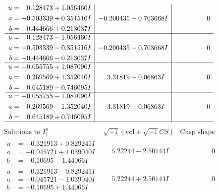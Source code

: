 \documentclass[1p]{elsarticle_modified}
\theoremstyle{definition}
\newcommand{\I}{\sqrt{-1}}
\begin{document}
$$\begin{array}{c|c|c}
\begin{aligned}
u &= \phantom{-}0.128473 + 1.056460 I \\
a &= -0.503339 + 0.351516 I \\
b &= -0.444666 + 0.213037 I\end{aligned}
 & -0.200435 + 0.703668 I & \phantom{-0.000000 } 0 \\ \hline\begin{aligned}
u &= \phantom{-}0.128473 - 1.056460 I \\
a &= -0.503339 - 0.351516 I \\
b &= -0.444666 - 0.213037 I\end{aligned}
 & -0.200435 - 0.703668 I & \phantom{-0.000000 } 0 \\ \hline\begin{aligned}
u &= -0.055755 + 1.087090 I \\
a &= \phantom{-}0.269569 + 1.352040 I \\
b &= \phantom{-}0.645189 - 0.746095 I\end{aligned}
 & \phantom{-}3.31819 + 0.06863 I & \phantom{-0.000000 } 0 \\ \hline\begin{aligned}
u &= -0.055755 - 1.087090 I \\
a &= \phantom{-}0.269569 - 1.352040 I \\
b &= \phantom{-}0.645189 + 0.746095 I\end{aligned}
 & \phantom{-}3.31819 - 0.06863 I & \phantom{-0.000000 } 0\\
 \hline 
 \end{array}$$\newpage$$\begin{array}{c|c|c}  
\text{Solutions to }I^u_{1}& \I (\text{vol} + \sqrt{-1}CS) & \text{Cusp shape}\\
 \hline 
\begin{aligned}
u &= -0.321913 + 0.829241 I \\
a &= -0.045721 + 1.039040 I \\
b &= -0.10695 - 1.44066 I\end{aligned}
 & \phantom{-}5.22244 - 2.50144 I & \phantom{-0.000000 } 0 \\ \hline\begin{aligned}
u &= -0.321913 - 0.829241 I \\
a &= -0.045721 - 1.039040 I \\
b &= -0.10695 + 1.44066 I\end{aligned}
 & \phantom{-}5.22244 + 2.50144 I & \phantom{-0.000000 } 0 \\ \hline\begin{aligned}

\end{aligned}
\end{array}$$
\end{document}
